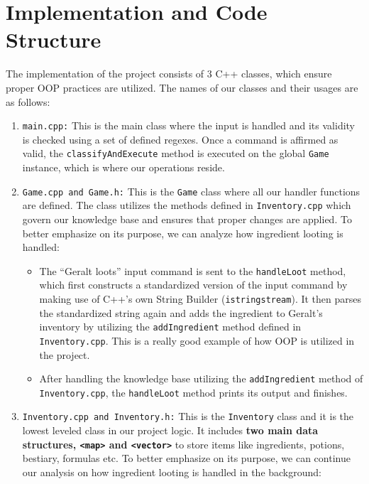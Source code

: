 \documentclass[a4paper,12pt]{article}
\begin{document}
\section{Implementation and Code Structure}
The implementation of the project consists of 3 C++ classes, which ensure proper OOP practices are utilized. The names of our classes and their usages are as follows:
\begin{enumerate}[topsep=0.5ex, partopsep=0pt, parsep=0pt, itemsep=0.5ex]
    \item \texttt{main.cpp:} This is the main class where the input is handled and its validity is checked using a set of defined regexes. Once a command is affirmed as valid, the \verb|classifyAndExecute| method is executed on the global \texttt{Game} instance, which is where our operations reside.
    \item \texttt{Game.cpp and Game.h:} This is the \texttt{Game} class where all our handler functions are defined. The class utilizes the methods defined in \verb|Inventory.cpp| which govern our knowledge base and ensures that proper changes are applied. To better emphasize on its purpose, we can analyze how ingredient looting is handled:
    \begin{itemize}[topsep=0.5ex, partopsep=0pt, parsep=0pt, itemsep=0.5ex]
        \item The “Geralt loots” input command is sent to the \verb|handleLoot| method, which first constructs a standardized version of the input command by making use of C++’s own String Builder (\verb|istringstream|). It then parses the standardized string again and adds the ingredient to Geralt’s inventory by utilizing the \verb|addIngredient| method defined in \verb|Inventory.cpp|. This is a really good example of how OOP is utilized in the project.
        \item After handling the knowledge base utilizing the \verb|addIngredient| method of \verb|Inventory.cpp|, the \verb|handleLoot| method prints its output and finishes.
    \end{itemize}
    \item \texttt{Inventory.cpp and Inventory.h:} This is the \texttt{Inventory} class and it is the lowest leveled class in our project logic. It includes \textbf{two main data structures, \texttt{<map>} and \texttt{<vector>}} to store items like ingredients, potions, bestiary, formulas etc. To better emphasize on its purpose, we can continue our analysis on how ingredient looting is handled in the background:
    \begin{itemize}[topsep=0.5ex, partopsep=0pt, parsep=0pt, itemsep=0.5ex]

\end{itemize}
\end{enumerate}
\end{document}
